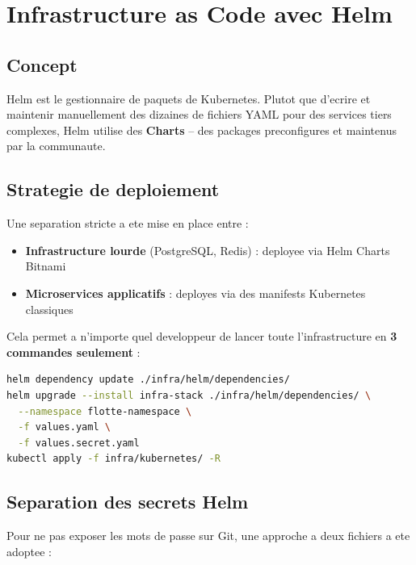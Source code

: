 \documentclass[12pt,a4paper]{article}
\begin{document}
\section{Infrastructure as Code avec Helm}

\subsection{Concept}

Helm est le gestionnaire de paquets de Kubernetes. Plutot que d'ecrire et maintenir
manuellement des dizaines de fichiers YAML pour des services tiers complexes, Helm utilise
des \textbf{Charts} -- des packages preconfigures et maintenus par la communaute.

\subsection{Strategie de deploiement}

Une separation stricte a ete mise en place entre :

\begin{itemize}
  \item \textbf{Infrastructure lourde} (PostgreSQL, Redis) : deployee via Helm Charts Bitnami
  \item \textbf{Microservices applicatifs} : deployes via des manifests Kubernetes classiques
\end{itemize}

Cela permet a n'importe quel developpeur de lancer toute l'infrastructure en
\textbf{3 commandes seulement} :

\begin{lstlisting}[language=bash, caption=Lancement complet de l'infrastructure]
helm dependency update ./infra/helm/dependencies/
helm upgrade --install infra-stack ./infra/helm/dependencies/ \
  --namespace flotte-namespace \
  -f values.yaml \
  -f values.secret.yaml
kubectl apply -f infra/kubernetes/ -R
\end{lstlisting}

\subsection{Separation des secrets Helm}

Pour ne pas exposer les mots de passe sur Git, une approche a deux fichiers a ete adoptee :
\end{document}
